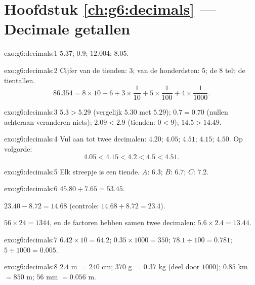 \section*{Hoofdstuk \ref{ch:g6:decimals} --- Decimale getallen}

\begin{solution}{exo:g6:decimals:1}
$5.37$; \quad $0.9$; \quad $12.004$; \quad $8.05$.
\end{solution}

\begin{solution}{exo:g6:decimals:2}
Cijfer van de tienden: $3$; van de honderdsten: $5$; de $8$ telt de
tientallen.
\[
86.354 = 8 \times 10 + 6 + 3 \times \frac{1}{10} + 5 \times
\frac{1}{100} + 4 \times \frac{1}{1000}.
\]
\end{solution}

\begin{solution}{exo:g6:decimals:3}
$5.3 > 5.29$ (vergelijk $5.30$ met $5.29$); \quad
$0.7 = 0.70$ (nullen achteraan veranderen niets); \quad
$2.09 < 2.9$ (tienden: $0 < 9$); \quad
$14.5 > 14.49$.
\end{solution}

\begin{solution}{exo:g6:decimals:4}
Vul aan tot twee decimalen: $4.20$; $4.05$; $4.51$; $4.15$; $4.50$. Op
volgorde:
\[
4.05 < 4.15 < 4.2 < 4.5 < 4.51 .
\]
\end{solution}

\begin{solution}{exo:g6:decimals:5}
Elk streepje is een tiende. $A$: $6.3$; \quad $B$: $6.7$; \quad $C$: $7.2$.
\end{solution}

\begin{solution}{exo:g6:decimals:6}
$45.80 + 7.65 = 53.45$.

$23.40 - 8.72 = 14.68$ (controle: $14.68 + 8.72 = 23.4$).

$56 \times 24 = 1344$, en de factoren hebben samen twee decimalen:
$5.6 \times 2.4 = 13.44$.
\end{solution}

\begin{solution}{exo:g6:decimals:7}
$6.42 \times 10 = 64.2$; \quad
$0.35 \times 1000 = 350$; \quad
$78.1 \div 100 = 0.781$; \quad
$5 \div 1000 = 0.005$.
\end{solution}

\begin{solution}{exo:g6:decimals:8}
$2.4$ m $= 240$ cm; \quad $370$ g $= 0.37$ kg (deel door $1000$); \quad
$0.85$ km $= 850$ m; \quad $56$ mm $= 0.056$ m.
\end{solution}


